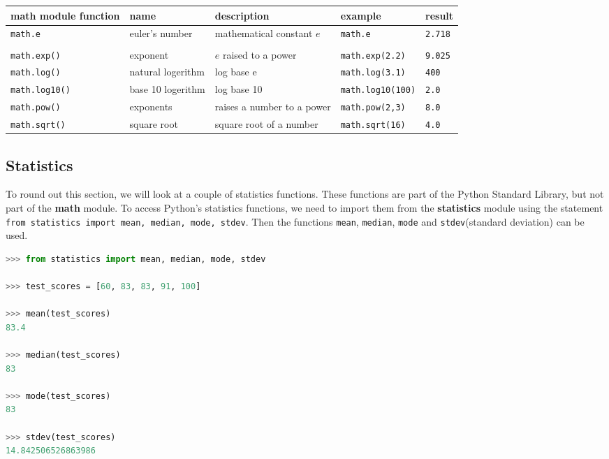 \documentclass{book}
\newcommand{\passthrough}[1]{#1}
\begin{document}
\begin{longtable}[]{@{}lllll@{}}
\toprule
math module function & name & description & example &
result\tabularnewline
\midrule
\endhead
\passthrough{\lstinline!math.e!} & euler's number & mathematical
constant \(e\) & \passthrough{\lstinline!math.e!} &
\passthrough{\lstinline!2.718!}\tabularnewline
& & & &\tabularnewline
\passthrough{\lstinline!math.exp()!} & exponent & \(e\) raised to a
power & \passthrough{\lstinline!math.exp(2.2)!} &
\passthrough{\lstinline!9.025!}\tabularnewline
\passthrough{\lstinline!math.log()!} & natural logerithm & log base e &
\passthrough{\lstinline!math.log(3.1)!} &
\passthrough{\lstinline!400!}\tabularnewline
\passthrough{\lstinline!math.log10()!} & base 10 logerithm & log base 10
& \passthrough{\lstinline!math.log10(100)!} &
\passthrough{\lstinline!2.0!}\tabularnewline
\passthrough{\lstinline!math.pow()!} & exponents & raises a number to a
power & \passthrough{\lstinline!math.pow(2,3)!} &
\passthrough{\lstinline!8.0!}\tabularnewline
\passthrough{\lstinline!math.sqrt()!} & square root & square root of a
number & \passthrough{\lstinline!math.sqrt(16)!} &
\passthrough{\lstinline!4.0!}\tabularnewline
\bottomrule
\end{longtable}
    




    
        \hypertarget{statistics}{%
\subsection{Statistics}\label{statistics}}
    




    
        To round out this section, we will look at a couple of statistics
functions. These functions are part of the Python Standard Library, but
not part of the \textbf{math} module. To access Python's statistics
functions, we need to import them from the \textbf{statistics} module
using the statement
\passthrough{\lstinline!from statistics import mean, median, mode, stdev!}.
Then the functions \passthrough{\lstinline!mean!},
\passthrough{\lstinline!median!}, \passthrough{\lstinline!mode!} and
\passthrough{\lstinline!stdev!}(standard deviation) can be used.

\begin{lstlisting}[language=Python]
>>> from statistics import mean, median, mode, stdev
    
>>> test_scores = [60, 83, 83, 91, 100]
    
>>> mean(test_scores)
83.4

>>> median(test_scores)
83

>>> mode(test_scores)
83
    
>>> stdev(test_scores)
14.842506526863986 
\end{lstlisting}
\end{document}

